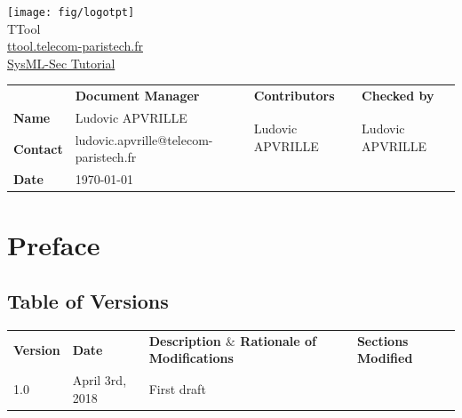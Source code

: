 \documentclass[12pt]{article}
\begin{document}
\sloppy 

\begin{center}

\texttt{[image: fig/logotpt]}
\vspace{10 pt}\\
\Huge TTool \\
\vspace{10 pt}
\Large \url{ttool.telecom-paristech.fr}
\vspace{20 pt}\\
\underline{\Large SysML-Sec Tutorial}
\vspace{30 pt}
\end{center}

\begin{table}[H]
\large
\centering
\begin{adjustbox}{width=\textwidth}
\begin{tabular}{ |p{1.6cm}|p{6.0cm}|p{4.2cm}|p{4.2cm}| }
\hhline{----}
 & \textbf{Document Manager} & \textbf{Contributors}  & \textbf{Checked by}  \\ 
\hhline{----}
\textbf{Name}   & Ludovic APVRILLE & \multirow{2}{*}{Ludovic APVRILLE} &
\multirow{2}{*}{Ludovic APVRILLE} \\
\hhline{--~~}
\textbf{Contact} & ludovic.apvrille@telecom-paristech.fr &  &  \\ 
\hhline{--~~}
\textbf{Date} & \today &  &  \\ 
\hline
\end{tabular}
\end{adjustbox}
\end{table}

\newpage
\tableofcontents


\newpage
\section{Preface}

\subsection{Table of Versions}

\begin{table}[H]
\large
\centering
\begin{adjustbox}{width=\textwidth}
\begin{tabular}{ |p{1.5cm}|p{2.5cm}|p{9.0cm}|p{3.0cm}| }
\hhline{----}
\textbf{Version} & \textbf{Date} & \textbf{Description  $  \&  $  Rationale of
Modifications} & \textbf{Sections Modified} \\
\hhline{----}
1.0 & April 3rd, 2018 & First draft &  \\ 
\hline
\end{tabular}
\end{adjustbox}
\end{table}
\end{document}
